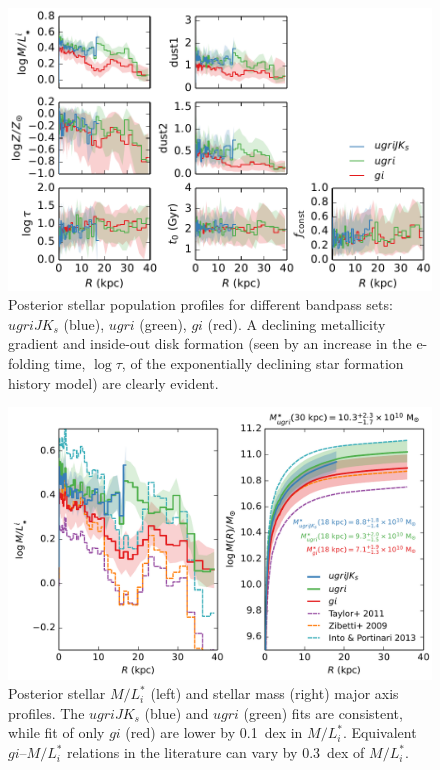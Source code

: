\documentclass{iau}
\begin{document}
\begin{figure}
\centering
\includegraphics[width=0.7\columnwidth]{sick_fig1} 
\caption{Posterior stellar population profiles for different bandpass sets: $ugriJK_s$ (blue), $ugri$ (green), $gi$ (red).
A declining metallicity gradient and inside-out disk formation (seen by an increase in the e-folding time, $\log \tau$, of the exponentially declining star formation history model) are clearly evident.}
\label{fig:pop_profile}
\end{figure}

\begin{figure}
\centering
\includegraphics[width=0.7\columnwidth]{sick_fig2} 
\caption{Posterior stellar $M/L_i^*$ (left) and stellar mass (right) major axis profiles.
The $ugriJK_s$ (blue) and $ugri$ (green) fits are consistent, while fit of only $gi$ (red) are lower by 0.1~dex in $M/L_i^*$.
Equivalent $gi$--$M/L_i^*$ relations in the literature can vary by 0.3~dex of $M/L_i^*$.}
\label{fig:mass_profile}
\end{figure}
\end{document}
